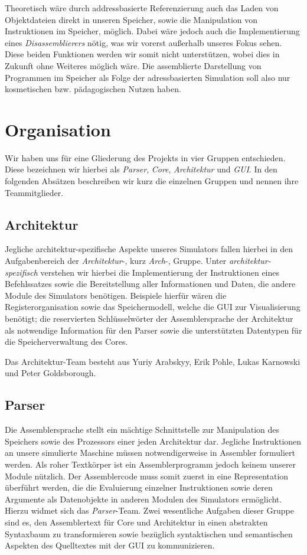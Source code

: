Theoretisch wäre durch addressbasierte Referenzierung auch das Laden von
Objektdateien direkt in unseren Speicher, sowie die Manipulation von
Instruktionen im Speicher, möglich. Dabei wäre jedoch auch die Implementierung
eines \emph{Disassemblierers} nötig, was wir vorerst außerhalb unseres Fokus
sehen. Diese beiden Funktionen werden wir somit nicht unterstützen, wobei dies
in Zukunft ohne Weiteres möglich wäre. Die assemblierte Darstellung von
Programmen im Speicher als Folge der adressbasierten Simulation soll also nur
kosmetischen bzw. pädagogischen Nutzen haben.

\section{Organisation}

Wir haben uns für eine Gliederung des Projekts in vier Gruppen entschieden.
Diese bezeichnen wir hierbei als \emph{Parser}, \emph{Core},
\emph{Architektur} und \emph{GUI}. In den folgenden Absätzen beschreiben wir kurz die
einzelnen Gruppen und nennen ihre Teammitglieder.

\subsection{Architektur}

Jegliche architektur-spezifische Aspekte
unseres Simulators fallen hierbei in den Aufgabenbereich der
\emph{Architektur}-, kurz \emph{Arch}-, Gruppe. Unter
\emph{architektur-spezifisch} verstehen wir hierbei die Implementierung der
Instruktionen eines Befehlssatzes sowie die Bereitstellung aller Informationen
und Daten, die andere Module des Simulators benötigen. Beispiele hierfür wären
die Registerorganisation sowie das Speichermodell, welche die GUI zur
Visualisierung benötigt; die reservierten Schlüsselwörter der Assemblersprache
der Architektur als notwendige Information für den Parser sowie die
unterstützten Datentypen für die Speicherverwaltung des Cores.

Das Architektur-Team besteht aus Yuriy Arabskyy, Erik Pohle, Lukas Karnowski und
Peter Goldsborough.

\subsection{Parser}

Die Assemblersprache stellt ein mächtige Schnittstelle zur Manipulation des
Speichers sowie des Prozessors einer jeden Architektur dar. Jegliche
Instruktionen an unsere simulierte Maschine müssen notwendigerweise in Assembler
formuliert werden. Als roher Textkörper ist ein Assemblerprogramm jedoch keinem
unserer Module nützlich. Der Assemblercode muss somit zuerst in eine
Representation überführt werden, die die Evaluierung einzelner Instruktionen
sowie deren Argumente als Datenobjekte in anderen Modulen des Simulators
ermöglicht. Hierzu widmet sich das \emph{Parser}-Team. Zwei wesentliche Aufgaben
dieser Gruppe sind es, den Assemblertext für Core und Architektur in einen
abstrakten Syntaxbaum zu transformieren sowie bezüglich syntaktischen und
semantischen Aspekten des Quelltextes mit der GUI zu kommunizieren.

